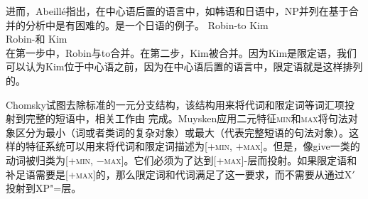 进而，Abeillé指出，在中心语后置的语言中，如韩语和日语中，NP并列在基于合并的分析中是有困难的。是一个日语的例子。
\ea
\label{coordination-head-final}
\gll Robin-to Kim\\
     Robin-和 Kim\\
\z
在第一步中，Robin与to合并。在第二步，Kim被合并。因为Kim是限定语，我们可以认为Kim位于中心语之前，因为在中心语后置的语言中，限定语就是这样排列的。

Chomsky试图去除标准\xbartc 的一元分支结构，该结构用来将代词和限定词等词汇项投射到完整的短语中，相关工作由 \citet{Muysken82a}完成。Muysken应用二元特征\textsc{min}和\textsc{max}将句法对象区分为最小（词或者类词的复杂对象）或最大（代表完整短语的句法对象）。这样的特征系统可以用来将代词和限定词描述为[+\textsc{min}, $+$\textsc{max}]。但是，像give一类的动词被归类为[+\textsc{min},  $-$\textsc{max}]。它们必须为了达到[+\textsc{max}]-层而投射。如果限定语和补足语需要是[+\textsc{max}]的，那么限定词和代词满足了这一要求，而不需要从\xzeroc 通过X$'$投射到XP"=层。

